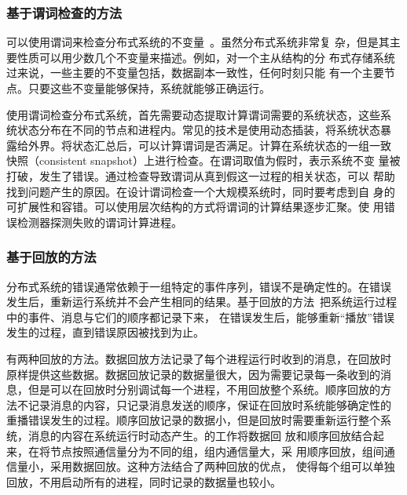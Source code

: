 % 


\subsubsection*{基于谓词检查的方法}

可以使用谓词来检查分布式系统的不变量~\cite{d3s}。虽然分布式系统非常复
杂，但是其主要性质可以用少数几个不变量来描述。例如，对一个主从结构的分
布式存储系统过来说，一些主要的不变量包括，数据副本一致性，任何时刻只能
有一个主要节点。只要这些不变量能够保持，系统就能够正确运行。

使用谓词检查分布式系统，首先需要动态提取计算谓词需要的系统状态，这些系
统状态分布在不同的节点和进程内。常见的技术是使用动态插装，将系统状态暴
露给外界。将状态汇总后，可以计算谓词是否满足。计算在系统状态的一组一致
快照（consistent snapshot）上进行检查。在谓词取值为假时，表示系统不变
量被打破，发生了错误。通过检查导致谓词从真到假这一过程的相关状态，可以
帮助找到问题产生的原因。在设计谓词检查一个大规模系统时，同时要考虑到自
身的可扩展性和容错。可以使用层次结构的方式将谓词的计算结果逐步汇聚。使
用错误检测器探测失败的谓词计算进程。

\subsubsection*{基于回放的方法}

分布式系统的错误通常依赖于一组特定的事件序列，错误不是确定性的。在错误
发生后，重新运行系统并不会产生相同的结果。基于回放的方法~\cite{liblog,
friday, r2, mpiwiz}把系统运行过程中的事件、消息与它们的顺序都记录下来，
在错误发生后，能够重新“播放”错误发生的过程，直到错误原因被找到为止。

有两种回放的方法。数据回放方法记录了每个进程运行时收到的消息，在回放时
原样提供这些数据。数据回放记录的数据量很大，因为需要记录每一条收到的消
息，但是可以在回放时分别调试每一个进程，不用回放整个系统。顺序回放的方
法不记录消息的内容，只记录消息发送的顺序，保证在回放时系统能够确定性的
重播错误发生的过程。顺序回放记录的数据小，但是回放时需要重新运行整个系
统，消息的内容在系统运行时动态产生。的工作将数据回
放和顺序回放结合起来，在将节点按照通信量分为不同的组，组内通信量大，采
用顺序回放，组间通信量小，采用数据回放。这种方法结合了两种回放的优点，
使得每个组可以单独回放，不用启动所有的进程，同时记录的数据量也较小。

